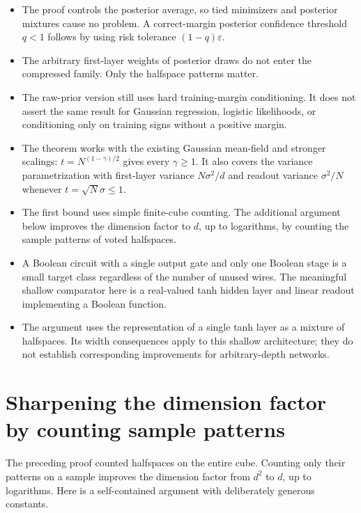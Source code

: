 \documentclass[11pt]{article}
\providecommand{\tightlist}{\setlength{\itemsep}{0pt}\setlength{\parskip}{0pt}}
\begin{document}
\begin{itemize}
\tightlist
\item
  The proof controls the posterior average, so tied minimizers and
  posterior mixtures cause no problem. A correct-margin posterior
  confidence threshold \(q<1\) follows by using risk tolerance
  \((1-q)\varepsilon\).
\item
  The arbitrary first-layer weights of posterior draws do not enter the
  compressed family. Only the halfspace patterns matter.
\item
  The raw-prior version still uses hard training-margin conditioning. It
  does not assert the same result for Gaussian regression, logistic
  likelihoods, or conditioning only on training signs without a positive
  margin.
\item
  The theorem works with the existing Gaussian mean-field and stronger
  scalings: \(t=N^{(1-\gamma)/2}\) gives every \(\gamma\ge1\). It also
  covers the variance parametrization with first-layer variance
  \(N\sigma^2/d\) and readout variance \(\sigma^2/N\) whenever
  \(t=\sqrt N\sigma\le1\).
\item
  The first bound uses simple finite-cube counting. The additional
  argument below improves the dimension factor to \(d\), up to
  logarithms, by counting the sample patterns of voted halfspaces.
\item
  A Boolean circuit with a single output gate and only one Boolean stage
  is a small target class regardless of the number of unused wires. The
  meaningful shallow comparator here is a real-valued tanh hidden layer
  and linear readout implementing a Boolean function.
\item
  The argument uses the representation of a single tanh layer as a
  mixture of halfspaces. Its width consequences apply to this shallow
  architecture; they do not establish corresponding improvements for
  arbitrary-depth networks.
\end{itemize}

\section{Sharpening the dimension factor by counting sample
patterns}\label{sharpening-the-dimension-factor-by-counting-sample-patterns}

The preceding proof counted halfspaces on the entire cube. Counting only
their patterns on a sample improves the dimension factor from \(d^2\) to
\(d\), up to logarithms. Here is a self-contained argument with
deliberately generous constants.
\end{document}
